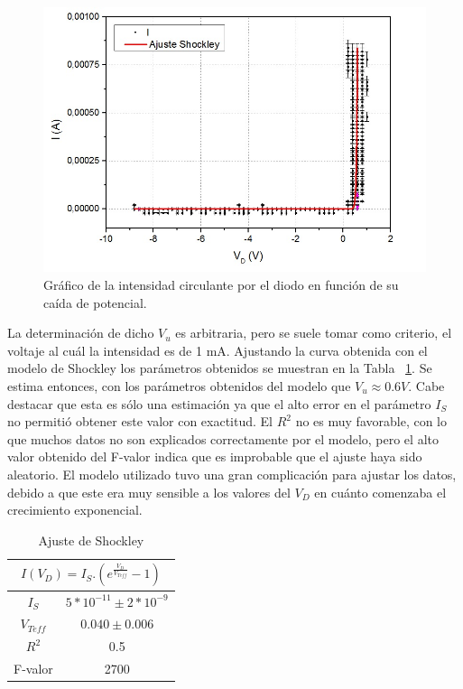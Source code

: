 \documentclass[twoside,twocolumn,a4paper]{article}
\begin{document}
\begin{figure}[h!]
\includegraphics[width=\linewidth]{diodograph.jpg}
\captionsetup{justification=centering}
\caption{Gr\'afico de la intensidad circulante por el diodo en funci\'on de su ca\'ida de potencial.}
\label{fig:diodo_shock}
\end{figure}

La determinaci\'on de dicho $V_u$ es arbitraria, pero se suele tomar como criterio, el voltaje al cu\'al la intensidad es de 1 mA. Ajustando la curva obtenida con el modelo de Shockley los par\'ametros obtenidos se muestran en la Tabla ~\ref{tab:diodo}. Se estima entonces, con los par\'ametros obtenidos del modelo que $V_u\approx0.6V$. Cabe destacar que esta es s\'olo una estimaci\'on ya que el alto error en el par\'ametro $I_S$ no permiti\'o obtener este valor con exactitud. El $R^2$ no es muy favorable, con lo que muchos datos no son explicados correctamente por el modelo, pero el alto valor obtenido del F-valor indica que es improbable que el ajuste haya sido aleatorio. El modelo utilizado tuvo una gran complicaci\'on para ajustar los datos, debido a que este era muy sensible a los valores del $V_D$ en cu\'anto comenzaba el crecimiento exponencial. \par 

\begin{table}[h!]
\centering
\captionsetup{justification=centering}
\caption{Ajuste de Shockley}
\label{tab:diodo}
\begin{tabular}{|c|c|}
\hline
\multicolumn{2}{|c|}{$I(V_D)=I_S . (e^\frac{V_D}{V_{Teff}}-1)$} \\ \hline
$I_S$                       & $5*10^{-11}\pm2*10^{-9}$                   \\ \hline
$V_{Teff}$                  & $0.040\pm0.006$                  \\ \hline
$R^2$                       & 0.5                              \\ \hline
F-valor                     & 2700                             \\ \hline
\end{tabular}
\end{table}
\end{document}
